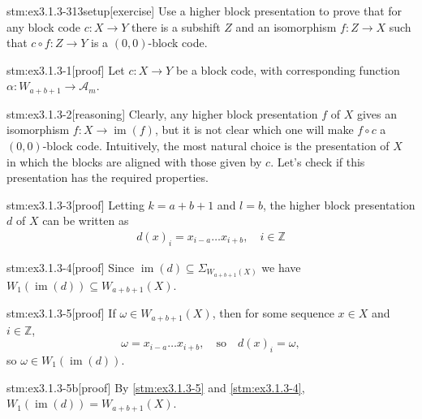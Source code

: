 
\begin{stm}{stm:ex3.1.3-313setup}[exercise]
Use a higher block presentation to prove that for any block code $c: X \to Y$ there is a subshift $Z$ and an isomorphism $f: Z \to X$ such that $c \circ f: Z \to Y$ is a $(0,0)$-block code.
\end{stm}


\begin{stm}{stm:ex3.1.3-1}[proof]
Let $c: X \to Y$ be a block code, with corresponding function $\alpha: W_{a+b+1} \to \mathcal{A}_m$.
\end{stm}

\begin{stm}{stm:ex3.1.3-2}[reasoning]
Clearly, any higher block presentation $f$ of $X$ gives an isomorphism $f: X \to \operatorname{im}(f)$, but it is not clear which one will make $f \circ c$ a $(0,0)$-block code. Intuitively, the most natural choice is the presentation of $X$ in which the blocks are aligned with those given by $c$. Let's check if this presentation has the required properties.
\end{stm}

\begin{stm}{stm:ex3.1.3-3}[proof]
Letting $k = a + b + 1$ and $l = b$, the higher block presentation $d$ of $X$ can be written as
\begin{align*}
d(x)_i = x_{i-a} \ldots x_{i+b}, \quad i \in \mathbb{Z}
\end{align*}
\end{stm}

\begin{stm}{stm:ex3.1.3-4}[proof]
Since $\operatorname{im}(d) \subseteq \Sigma_{W_{a+b+1}(X)}$ we have $W_1(\operatorname{im}(d)) \subseteq W_{{a+b+1}}(X)$.
\end{stm}

\begin{stm}{stm:ex3.1.3-5}[proof]
If $\omega \in W_{a+b+1}(X)$, then for some sequence $x \in X$ and $i \in \mathbb{Z}$,
\[
\omega = x_{i-a} \ldots x_{i+b}, \quad \text{so} \quad d(x)_i = \omega,
\]
so $\omega \in W_1(\operatorname{im}(d))$.
\end{stm}

\begin{stm}{stm:ex3.1.3-5b}[proof]
By \ref{stm:ex3.1.3-5} and \ref{stm:ex3.1.3-4}, $W_1(\operatorname{im}(d)) = W_{a+b+1}(X)$.
\end{stm}

